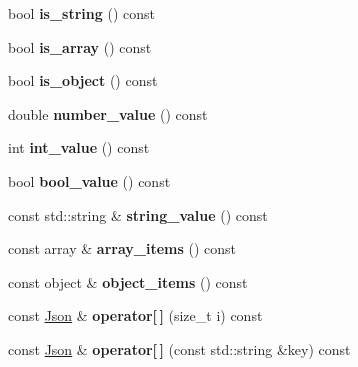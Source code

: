 \begin{DoxyCompactItemize}
bool {\bfseries is\+\_\+string} () const
\item 
\mbox{\label{classjson11_1_1_json_a19bae712f89c9bd771fead54b447611a}} 
bool {\bfseries is\+\_\+array} () const
\item 
\mbox{\label{classjson11_1_1_json_a8bc1877dd93ffa5457c214308e0cf472}} 
bool {\bfseries is\+\_\+object} () const
\item 
\mbox{\label{classjson11_1_1_json_a735c0d270710c51ba06627c328a58138}} 
double {\bfseries number\+\_\+value} () const
\item 
\mbox{\label{classjson11_1_1_json_af7093e5034daa0e138be9013440292c9}} 
int {\bfseries int\+\_\+value} () const
\item 
\mbox{\label{classjson11_1_1_json_a23ccdd948ff1738a61d416d89d3a80b0}} 
bool {\bfseries bool\+\_\+value} () const
\item 
\mbox{\label{classjson11_1_1_json_a7054ba4a8432d19386e0d16cd69219f0}} 
const std\+::string \& {\bfseries string\+\_\+value} () const
\item 
\mbox{\label{classjson11_1_1_json_aee966f000b422ae22f33d70dab73f524}} 
const array \& {\bfseries array\+\_\+items} () const
\item 
\mbox{\label{classjson11_1_1_json_a6658c06954b8bc9b59cf615dfb87b52c}} 
const object \& {\bfseries object\+\_\+items} () const
\item 
\mbox{\label{classjson11_1_1_json_a27be11485819f6556791ef5b37c63fe6}} 
const \mbox{\hyperlink{classjson11_1_1_json}{Json}} \& {\bfseries operator\mbox{[}$\,$\mbox{]}} (size\+\_\+t i) const
\item 
\mbox{\label{classjson11_1_1_json_a1aa12f6501ce2f84f733fe7d96e24e7d}} 
const \mbox{\hyperlink{classjson11_1_1_json}{Json}} \& {\bfseries operator\mbox{[}$\,$\mbox{]}} (const std\+::string \&key) const
\item 
\mbox{\label{classjson11_1_1_json_a6b92b393846c9e01f77be6401978eb03}} 

\end{DoxyCompactItemize}
